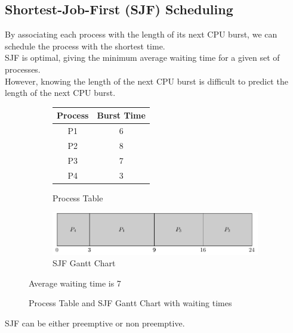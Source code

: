 \documentclass{book/custombook}
\begin{document}
            \subsection{Shortest-Job-First (SJF) Scheduling}
                By associating each process with the length of its next CPU burst, we can schedule the process
                with the shortest time.\\
                SJF is optimal, giving the minimum average waiting time for a given set of processes.\\
                However, knowing the length of the next CPU burst is difficult to predict the length of the next
                CPU burst.\\
                \begin{figure}[H]
                    \centering
                    \begin{subfigure}{0.5\linewidth}
                        \centering
                        \begin{tabular}{cc}
                            Process & Burst Time\\
                            \toprule
                            P1 & 6\\
                            P2 & 8\\
                            P3 & 7\\
                            P4 & 3\\
                        \end{tabular}
                        \caption{Process Table}
                    \end{subfigure}%
                    \begin{subfigure}{0.5\linewidth}
                        \centering
                        \includegraphics[width=\linewidth]{figures/sjf_gantt_1.pdf}
                        \caption{SJF Gantt Chart}
                    \end{subfigure}
                    Average waiting time is 7
                    \caption{Process Table and SJF Gantt Chart with waiting times}
                \end{figure}
                SJF can be either preemptive or non preemptive.\\
\end{document}
